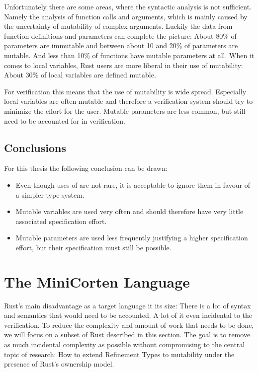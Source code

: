 \documentclass[twoside, english]{sdqthesis}
\theoremstyle{definition}
\begin{document}
Unfortunately there are some areas, where the syntactic analysis is not sufficient. Namely the analysis of function calls and arguments, which is mainly caused by the uncertainty of mutability of complex arguments.
Luckily the data from function definitions and parameters can complete the picture: About 80\% of parameters are immutable and between about 10 and 20\% of parameters are mutable. And less than 10\% of functions have mutable parameters at all.
When it comes to local variables, Rust users are more liberal in their use of mutability:
About 30\% of local variables are defined mutable.

For verification this means that the use of mutability is wide spread. Especially local variables are often mutable and therefore a verification system should try to minimize the effort for the user. Mutable parameters are less common, but still need to be accounted for in verification.

\section{Conclusions}

For this thesis the following conclusion can be drawn:

\begin{itemize}
  \item Even though uses of  are not rare, it is acceptable to ignore them in favour of a simpler type system.
  \item Mutable variables are used very often and should therefore have very little associated specification effort.
  \item Mutable parameters are used less frequently justifying a higher specification effort, but their specification must still be possible.
\end{itemize}

\chapter{The MiniCorten Language} \label{ch:language} 

Rust's main disadvantage as a target language it its size: There is a lot of syntax and semantics that would need to be accounted. A lot of it even incidental to the verification. 
To reduce the complexity and amount of work that needs to be done, we will focus on a subset of Rust described in this section.
The goal is to remove as much incidental complexity as possible without compromising to the central topic of research: How to extend Refinement Types to mutability under the presence of Rust's ownership model. 
\end{document}
